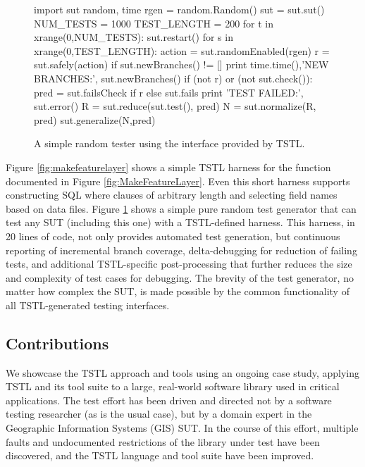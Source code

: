 \begin{figure}
{\scriptsize
\begin{code}
import sut random, time
rgen = random.Random()
sut = sut.sut()
NUM\_TESTS = 1000
TEST\_LENGTH = 200 
for t in xrange(0,NUM\_TESTS):
   sut.restart()
   for s in xrange(0,TEST\_LENGTH): 
       action = sut.randomEnabled(rgen)
       r = sut.safely(action)
       if sut.newBranches() != []
          print time.time(),'NEW BRANCHES:', sut.newBranches()
       if (not r) or (not sut.check()):
          pred = sut.failsCheck if r else sut.fails
          print 'TEST FAILED:', sut.error() 
          R = sut.reduce(sut.test(), pred)
          N = sut.normalize(R, pred) 
          sut.generalize(N,pred)
\end{code}
}
\caption{A simple random tester using the interface provided by TSTL.}
\label{fig:rt}
\end{figure}

Figure \ref{fig:makefeaturelayer} shows a simple TSTL harness for the
function documented in Figure \ref{fig:MakeFeatureLayer}.  Even this short
harness supports constructing SQL where clauses of arbitrary
length and selecting field names based on data files.  Figure \ref{fig:rt} shows a simple pure random test generator
that can test any SUT (including this one) with a TSTL-defined
harness.  This harness, in 20 lines of code, not only provides
automated test generation, but continuous reporting of incremental
branch coverage, delta-debugging \cite{DD} for reduction of failing
tests, and additional TSTL-specific post-processing that further
reduces the size and complexity of test cases for debugging.  The
brevity of the test generator, no matter how complex the SUT, is made
possible by the common functionality of all TSTL-generated testing
interfaces.

\subsection{Contributions}

We showcase the TSTL approach and tools using an ongoing case study,
applying TSTL and its tool suite to a large, real-world software
library used in critical applications.  The test effort has been driven and directed not by a
software testing researcher (as is the usual case), but by a domain
expert in the Geographic Information Systems (GIS) SUT.  In the
course of this effort, multiple faults and undocumented restrictions of the library
under test have been discovered, and the TSTL language and tool suite have
been improved.

